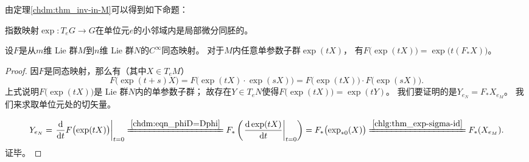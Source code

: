 由定理\ref{chdm:thm_inv-in-M}可以得到如下命题：
\begin{proposition}\label{chlg:thm_exp-sigma-id-cor1}
    指数映射$\exp : T_e G \to G$在单位元$e$的小邻域内是局部微分同胚的。
\end{proposition}



\begin{theorem}\label{chlg:thm_feef}
    设$F$是从$m$维 Lie 群$M$到$n$维 Lie 群$N$的$C^\infty$同态映射。
    对于$M$内任意单参数子群$\exp (tX)$，
    有$F\bigl(\exp (tX)\bigr) = \exp \bigl(t (F_{*} X)\bigr)$。
\end{theorem}
\begin{proof}
    因$F$是同态映射，那么有（其中$X\in T_eM$）
    \begin{equation*}
        F\bigl(\exp (t+s)X\bigr)=F\bigl(\exp (tX) \cdot \exp (sX) \bigr)
        =F\bigl(\exp (tX) \bigr)\cdot F\bigl( \exp (sX) \bigr) .
    \end{equation*}
    上式说明$F\bigl(\exp (tX)\bigr)$是 Lie 群$N$内的单参数子群；
    故存在$Y\in T_eN$使得$F\bigl(\exp (tX)\bigr)= \exp(tY)$。
    我们要证明的是$Y_{e_N} = F_* X_{e_M}$。
    我们来求取单位元处的切矢量。
    
    \begin{equation*}
        Y_{e_N}=
        \left.\frac{{\rm d}}{{\rm d} t}F\bigl(\exp (tX)\bigr)\right|_{t=0}
        \xlongequal{\ref{chdm:eqn_phiD=Dphi}}
        F_{*} \left(\left.\frac{{\rm d}\exp (tX)}{{\rm d} t}\right|_{t=0} \right)
        =F_{*} \bigl(\exp_{*0}(X) \bigr)   
        \xlongequal{\ref{chlg:thm_exp-sigma-id}}F_{*} (X_{e_M}) .
    \end{equation*} 
    证毕。
\end{proof}



